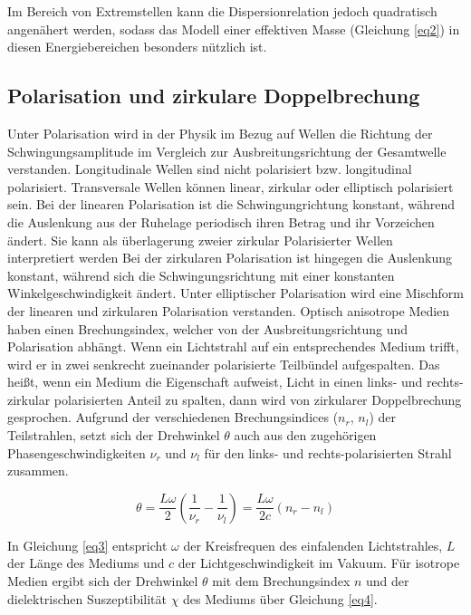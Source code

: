 Im Bereich von Extremstellen kann die Dispersionrelation jedoch quadratisch angenähert 
werden, sodass das Modell einer effektiven Masse (Gleichung \ref{eq2}) in diesen 
Energiebereichen besonders nützlich ist.

\subsection{Polarisation und zirkulare Doppelbrechung}
Unter Polarisation wird in der Physik im Bezug auf Wellen die Richtung der 
Schwingungsamplitude im Vergleich zur Ausbreitungsrichtung der Gesamtwelle 
verstanden. 
Longitudinale Wellen sind nicht polarisiert bzw. longitudinal polarisiert.
Transversale Wellen können linear, zirkular oder elliptisch polarisiert sein. 
Bei der linearen Polarisation ist die Schwingungrichtung konstant, während die 
Auslenkung aus der Ruhelage periodisch ihren Betrag und ihr Vorzeichen ändert.
Sie kann als überlagerung zweier zirkular Polarisierter Wellen interpretiert werden
Bei der zirkularen Polarisation ist hingegen die Auslenkung konstant, während sich die 
Schwingungsrichtung mit einer konstanten Winkelgeschwindigkeit ändert.
Unter elliptischer Polarisation wird eine Mischform der linearen und zirkularen 
Polarisation verstanden.
Optisch anisotrope Medien haben einen Brechungsindex, welcher von der 
Ausbreitungsrichtung und Polarisation abhängt. 
Wenn ein Lichtstrahl auf ein entsprechendes Medium trifft, wird er in zwei 
senkrecht zueinander polarisierte Teilbündel aufgespalten.
Das heißt, wenn ein Medium die Eigenschaft aufweist, Licht in einen 
links- und rechts-zirkular polarisierten Anteil zu spalten, dann wird von 
zirkularer Doppelbrechung gesprochen.
Aufgrund der verschiedenen Brechungsindices ($n_r$, $n_l$) der Teilstrahlen, setzt sich der 
Drehwinkel $\theta$ auch aus den zugehörigen Phasengeschwindigkeiten $\nu_r$ und $\nu_l$ 
für den links- und rechts-polarisierten Strahl zusammen.

\begin{equation}
    \theta = \frac{L\omega}{2} \left(\frac{1}{\nu_r} - \frac{1}{\nu_l} \right) = \frac{L\omega}{2c} (n_r - n_l )
    \label{eq3}
\end{equation}

In Gleichung \ref{eq3} entspricht $\omega$ der Kreisfrequen des einfalenden Lichtstrahles, 
$L$ der Länge des Mediums und $c$ der Lichtgeschwindigkeit im Vakuum.
Für isotrope Medien ergibt sich der Drehwinkel $\theta$ mit dem Brechungsindex $n$ und 
der dielektrischen Suszeptibilität $\chi$ des Mediums über Gleichung \ref{eq4}.

